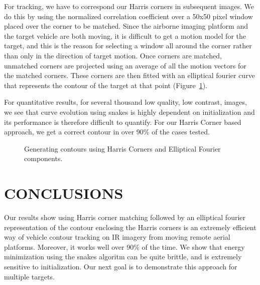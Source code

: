 \documentclass{article}
\begin{document}
For tracking, we have to correspond our Harris corners in subsequent images.  We do this by using the normalized correlation coefficient over a 50x50 pixel window placed over the corner to be matched.  Since the airborne imaging platform and the target vehicle are both moving, it is difficult to get a motion model for the target, and this is the reason for selecting a window all around the corner rather than only in the direction of target motion.  Once corners are matched, unmatched corners are projected using an average of all the motion vectors for the matched corners.  These corners are then fitted with an elliptical fourier curve that represents the contour of the target at that point (Figure~\ref{fig:Contours}).

For quantitative results, for several thousand low quality, low contrast, images, we see that curve evolution using snakes is highly dependent on initialization and its performance is therefore difficult to quantify.  For our Harris Corner based approach, we get a correct contour in over 90\% of the cases tested.

			\begin{figure}[t]
						\centering
			
						\caption{Generating contours using Harris Corners and Elliptical Fourier components.} 	
						\label{fig:Contours}	
			\end{figure}

\section{CONCLUSIONS}
Our results show using Harris corner matching followed by an elliptical fourier representation of the contour enclosing the Harris corners is an extremely efficient way of vehicle contour tracking on IR imagery from moving remote aerial platforms.  Moreover, it works well over 90\% of the time.  We show that energy minimization using the snakes algoritm can be quite brittle, and is extremely sensitive to initialization.  Our next goal is to demonstrate this approach for multiple targets.


 
\end{document}
